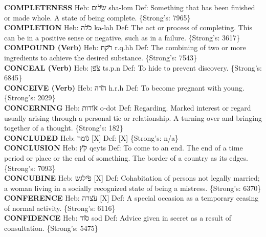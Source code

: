 {\textbf{COMPLETENESS} Heb: {\large\H שלום} sha-lom Def: Something that has been finished or made whole. A state of being complete. \{Strong's: 7965\}\hfill{}\\

\textbf{COMPLETION} Heb: {\large\H כלה} ka-lah Def: The act or process of completing. This can be in a positive sense or negative, such as in a failure. \{Strong's: 3617\}\hfill{}\\

\textbf{COMPOUND (Verb)} Heb: {\large\H רקח} r.q.hh Def: The combining of two or more ingredients to achieve the desired substance. \{Strong's: 7543\}\hfill{}\\

\textbf{CONCEAL (Verb)} Heb: {\large\H צפן} ts.p.n Def: To hide to prevent discovery. \{Strong's: 6845\}\hfill{}\\

\textbf{CONCEIVE (Verb)} Heb: {\large\H הרה} h.r.h Def: To become pregnant with young. \{Strong's: 2029\}\hfill{}\\

\textbf{CONCERNING} Heb: {\large\H אודות} o-dot Def: Regarding. Marked interest or regard usually arising through a personal tie or relationship. A turning over and bringing together of a thought. \{Strong's: 182\}\hfill{}\\

\textbf{CONCLUDED} Heb: {\large\H גומר} {[}X{]} Def: {[}X{]} \{Strong's: n/a\}\hfill{}\\

\textbf{CONCLUSION} Heb: {\large\H קץ} qeyts Def: To come to an end. The end of a time period or place or the end of something. The border of a country as its edges. \{Strong's: 7093\}\hfill{}\\

\textbf{CONCUBINE} Heb: {\large\H פילגש} {[}X{]} Def: Cohabitation of persons not legally married; a woman living in a socially recognized state of being a mistress. \{Strong's: 6370\}\hfill{}\\

\textbf{CONFERENCE} Heb: {\large\H עצרה} {[}X{]} Def: A special occasion as a temporary ceasing of normal activity. \{Strong's: 6116\}\hfill{}\\

\textbf{CONFIDENCE} Heb: {\large\H סוד} sod Def: Advice given in secret as a result of consultation. \{Strong's: 5475\}\hfill{}\\

}
